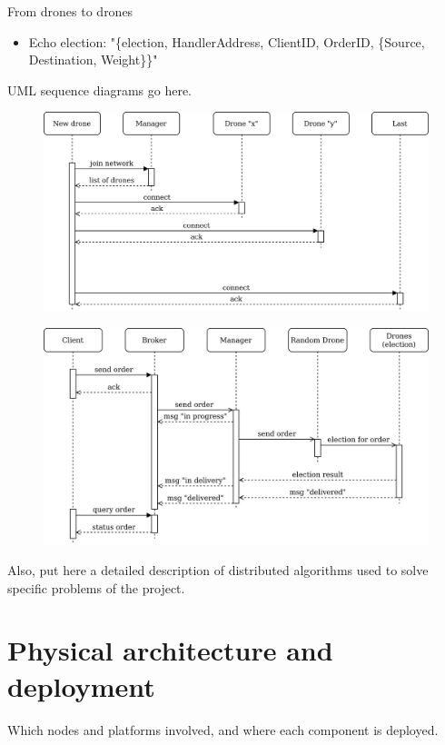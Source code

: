 \documentclass[a4paper, oneside]{memoir}
\begin{document}
From drones to drones
\begin{itemize}
	\item Echo election: "\{election, HandlerAddress, ClientID, OrderID, \{Source, Destination, Weight\}\}"
\end{itemize}
\newpage


UML sequence diagrams go here.
\begin{figure}[h!]
	\centering
	\includegraphics[width=\linewidth]{New-drone}
\end{figure}

\begin{figure}[h!]
	\centering
	\includegraphics[width=\linewidth]{New-order}
\end{figure}

Also, put here a detailed description of distributed algorithms used to solve specific problems of the project.

\section{Physical architecture and deployment}
Which nodes and platforms involved, and where each component is deployed.
\end{document}
